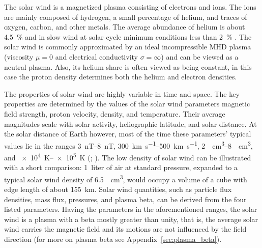 The solar wind is a magnetized plasma consisting of electrons and ions. The ions are mainly composed of hydrogen, a small percentage of helium, and traces of oxygen, carbon, and other metals. The average abundance of helium is about \SI{4.5}{\%} and in slow wind at solar cycle minimum conditions less than \SI{2}{\%} \citep{Feldman1978,Schwenn1983,Kasper2012}.
The solar wind is commonly approximated by an ideal incompressible MHD plasma (viscosity $\mu = 0$ and electrical conductivity $\sigma = \infty$) and can be viewed as a neutral plasma. Also, its helium share is often viewed as being constant, in this case the proton density determines both the helium and electron densities.

The properties of solar wind are highly variable in time and space. The key properties are determined by the values of the solar wind parameters magnetic field strength, proton velocity, density, and temperature. Their average magnitudes scale with solar activity, heliographic latitude, and solar distance. At the solar distance of Earth however, most of the time these parameters' typical values lie in the ranges \SIrange{3}{8}{\nano\tesla}, \SIrange{300}{500}{\km\per\s}, \SIrange{2}{8}{\per\cm\cubed}, and \SIrange{e4}{e5}{\K} (\citealp[p.~92]{Kivelson1995}; \citealt{Venzmer2018}). The low density of solar wind can be illustrated with a short comparison: 1~liter of air at standard pressure, expanded to a typical solar wind density of \SI{6.5}{\per\cm\cubed}, would occupy a volume of a cube with edge length of about \SI{155}{\km}.
Solar wind quantities, such as particle flux densities, mass flux, pressures, and plasma beta, can be derived from the four listed parameters. Having the parameters in the aforementioned ranges, the solar wind is a plasma with a beta mostly greater than unity, that is, the average solar wind carries the magnetic field and its motions are not influenced by the field direction (for more on plasma beta see Appendix~\ref{sec:plasma_beta}).

